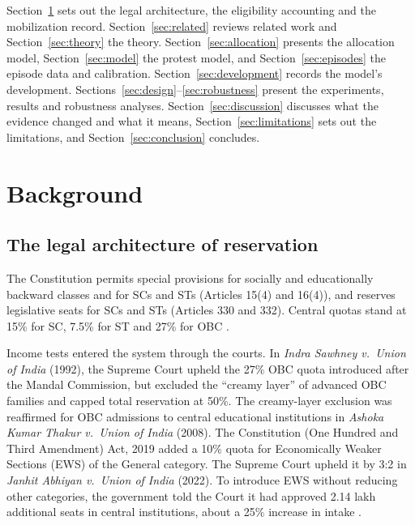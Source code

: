 \documentclass[11pt,a4paper]{article}
\begin{document}
Section~\ref{sec:background} sets out the legal architecture, the eligibility accounting and the mobilization record. Section~\ref{sec:related} reviews related work and Section~\ref{sec:theory} the theory. Section~\ref{sec:allocation} presents the allocation model, Section~\ref{sec:model} the protest model, and Section~\ref{sec:episodes} the episode data and calibration. Section~\ref{sec:development} records the model's development. Sections~\ref{sec:design}--\ref{sec:robustness} present the experiments, results and robustness analyses. Section~\ref{sec:discussion} discusses what the evidence changed and what it means, Section~\ref{sec:limitations} sets out the limitations, and Section~\ref{sec:conclusion} concludes.

\section{Background}
\label{sec:background}

\subsection{The legal architecture of reservation}
The Constitution permits special provisions for socially and educationally backward classes and for SCs and STs (Articles 15(4) and 16(4)), and reserves legislative seats for SCs and STs (Articles 330 and 332). Central quotas stand at 15\% for SC, 7.5\% for ST and 27\% for OBC \citep{galanter1984,deshpande2013}.

Income tests entered the system through the courts. In \emph{Indra Sawhney v.\ Union of India} (1992), the Supreme Court upheld the 27\% OBC quota introduced after the Mandal Commission, but excluded the ``creamy layer'' of advanced OBC families and capped total reservation at 50\%. The creamy-layer exclusion was reaffirmed for OBC admissions to central educational institutions in \emph{Ashoka Kumar Thakur v.\ Union of India} (2008). The Constitution (One Hundred and Third Amendment) Act, 2019 added a 10\% quota for Economically Weaker Sections (EWS) of the General category. The Supreme Court upheld it by 3:2 in \emph{Janhit Abhiyan v.\ Union of India} (2022). To introduce EWS without reducing other categories, the government told the Court it had approved 2.14 lakh additional seats in central institutions, about a 25\% increase in intake \citep{tribune2022}.
\end{document}
